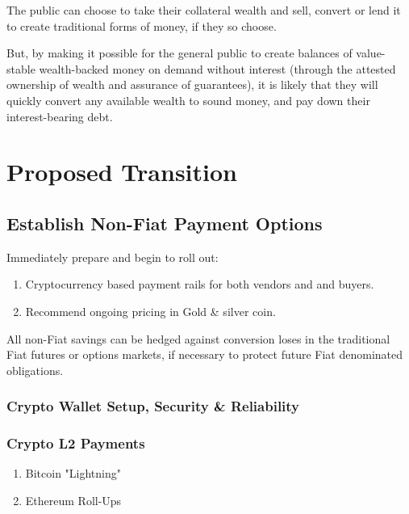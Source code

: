 \documentclass[11pt]{article}
\begin{document}
The public can choose to take their collateral wealth and sell, convert or lend it to create
traditional forms of money, if they so choose.

But, by making it possible for the general public to create balances of value-stable wealth-backed
money on demand without interest (through the attested ownership of wealth and assurance of
guarantees), it is likely that they will quickly convert any available wealth to sound money, and
pay down their interest-bearing debt.

\section{Proposed Transition}
\label{sec:org12c0cdb}

\subsection{Establish Non-Fiat Payment Options}
\label{sec:orgc953d65}

Immediately prepare and begin to roll out:

\begin{enumerate}
\item Cryptocurrency based payment rails for both vendors and and buyers.
\item Recommend ongoing pricing in Gold \& silver coin.
\end{enumerate}

All non-Fiat savings can be hedged against conversion loses in the traditional Fiat futures or
options markets, if necessary to protect future Fiat denominated obligations.

\subsubsection{Crypto Wallet Setup, Security \& Reliability}
\label{sec:org9b885de}

\subsubsection{Crypto L2 Payments}
\label{sec:org822b085}

\begin{enumerate}
\item Bitcoin "Lightning"
\label{sec:orgad68bc5}

\item Ethereum Roll-Ups
\label{sec:org72ae15c}
\end{enumerate}
\end{document}
